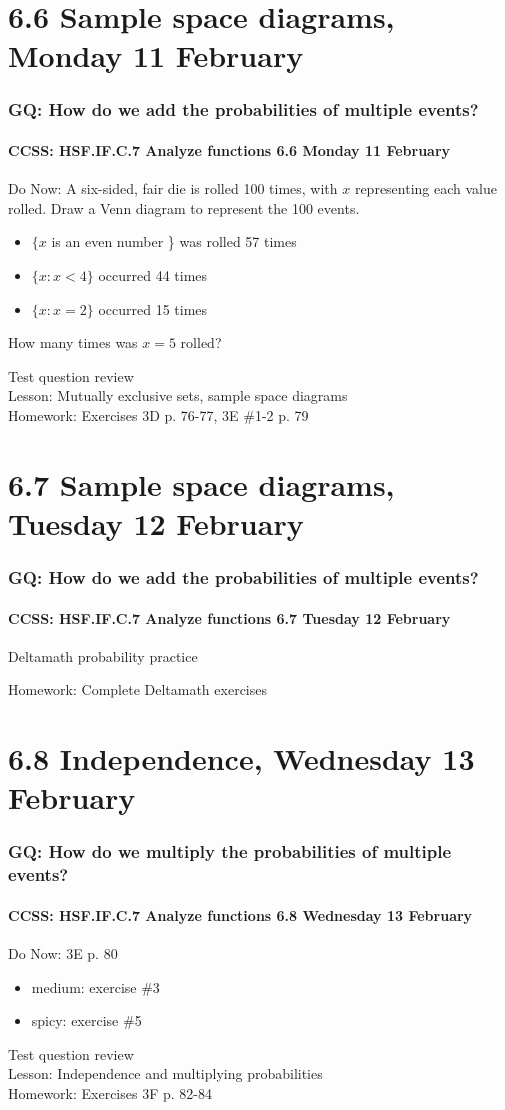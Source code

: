 \documentclass{beamer}
\begin{document}
\section{6.6 Sample space diagrams, Monday 11 February}
  \frame
  {
    \frametitle{GQ: How do we add the probabilities of multiple events?}
    \framesubtitle{CCSS: HSF.IF.C.7 Analyze functions \hfill \alert{6.6 Monday 11 February}}

    \begin{block}{Do Now: A six-sided, fair die is rolled 100 times, with $x$ representing each value rolled. Draw a Venn diagram to represent the 100 events.}
      \begin{itemize}
        \item $\{x$ is an even number \} was rolled 57 times
        \item $\{x: x <4\}$ occurred 44 times
        \item $\{x: x =2\}$ occurred 15 times
      \end{itemize}
      How many times was $x=5$ rolled?
    \end{block}
    Test question review\\
    Lesson: Mutually exclusive sets, sample space diagrams\\[0.5cm]
    Homework: Exercises 3D p. 76-77, 3E \#1-2 p. 79
  }


\section{6.7 Sample space diagrams, Tuesday 12 February}
  \frame
  {
    \frametitle{GQ: How do we add the probabilities of multiple events?}
    \framesubtitle{CCSS: HSF.IF.C.7 Analyze functions \hfill \alert{6.7 Tuesday 12 February}}

    \begin{block}{Deltamath probability practice}
    \end{block}
    Homework: Complete Deltamath exercises
  }

\section{6.8 Independence, Wednesday 13 February}
  \frame
  {
    \frametitle{GQ: How do we multiply the probabilities of multiple events?}
    \framesubtitle{CCSS: HSF.IF.C.7 Analyze functions \hfill \alert{6.8 Wednesday 13 February}}

    \begin{block}{Do Now: 3E p. 80}
      \begin{itemize}
        \item medium: exercise \#3
        \item spicy: exercise \#5
      \end{itemize}
    \end{block}
    Test question review\\
    Lesson: Independence and multiplying probabilities\\[0.5cm]
    Homework: Exercises 3F p. 82-84
  }
\end{document}
